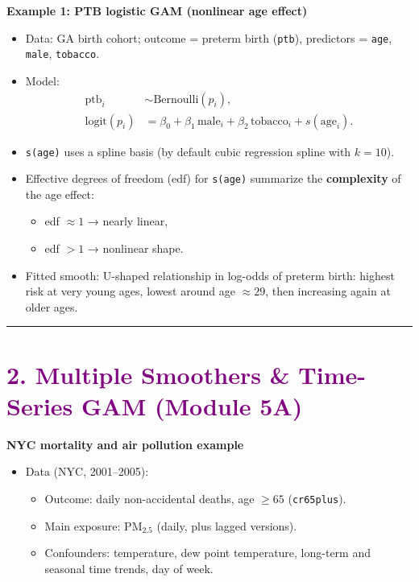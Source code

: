 \documentclass[
  letterpaper,
  DIV=11,
  numbers=noendperiod]{scrreprt}
\providecommand{\tightlist}{%
  \setlength{\itemsep}{0pt}\setlength{\parskip}{0pt}}\usepackage{longtable,booktabs,array}
\begin{document}
\textbf{Example 1: PTB logistic GAM (nonlinear age effect)}

\begin{itemize}
\tightlist
\item
  Data: GA birth cohort; outcome = preterm birth (\texttt{ptb}),
  predictors = \texttt{age}, \texttt{male}, \texttt{tobacco}.
\item
  Model: \[
  \begin{aligned}
  \text{ptb}_i &\sim \text{Bernoulli}(p_i),\\
  \text{logit}(p_i) &= \beta_0 + \beta_1 \,\text{male}_i
  + \beta_2 \,\text{tobacco}_i + s(\text{age}_i).
  \end{aligned}
  \]
\item
  \texttt{s(age)} uses a spline basis (by default cubic regression
  spline with \(k=10\)).
\item
  Effective degrees of freedom (edf) for \texttt{s(age)} summarize the
  \textbf{complexity} of the age effect:

  \begin{itemize}
  \tightlist
  \item
    edf \(\approx 1\) → nearly linear,
  \item
    edf \(> 1\) → nonlinear shape.
  \end{itemize}
\item
  Fitted smooth: U-shaped relationship in log-odds of preterm birth:
  highest risk at very young ages, lowest around age \(\approx 29\),
  then increasing again at older ages.
\end{itemize}

\begin{center}\rule{0.5\linewidth}{0.5pt}\end{center}

\hypertarget{section-44}{%
\section*{\texorpdfstring{\textcolor{purple}{2. Multiple Smoothers & Time-Series GAM (Module 5A)}}{}}\label{section-44}}

\markright{\textcolor{purple}{2. Multiple Smoothers & Time-Series GAM (Module 5A)}}

\textbf{NYC mortality and air pollution example}

\begin{itemize}
\tightlist
\item
  Data (NYC, 2001--2005):

  \begin{itemize}
  \tightlist
  \item
    Outcome: daily non-accidental deaths, age \(\ge 65\)
    (\texttt{cr65plus}).
  \item
    Main exposure: PM\(_{2.5}\) (daily, plus lagged versions).
  \item
    Confounders: temperature, dew point temperature, long-term and
    seasonal time trends, day of week.
  \end{itemize}
\end{itemize}
\end{document}
